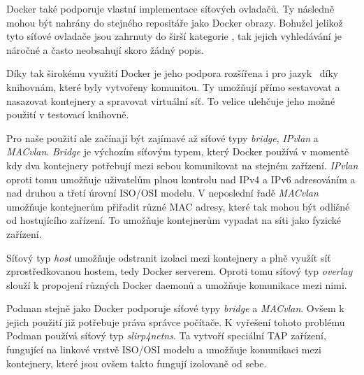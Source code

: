 Docker také podporuje vlastní implementace síťových ovladačů. Ty následně mohou být nahrány do stejného repositáře jako Docker obrazy. Bohužel jelikož tyto síťové ovladače jsou zahrnuty do širší kategorie , tak jejich vyhledávání je náročné a často neobsahují skoro žádný popis. \cite{docker_networking_overview}\cite{docker_brige_overview}

Díky tak širokému využití Docker je jeho podpora rozšířena i pro jazyk \csharp~díky knihovnám, které byly vytvořeny komunitou. Ty umožňují přímo sestavovat a nasazovat kontejnery a spravovat virtuální síť. To velice ulehčuje jeho možné použití v testovací knihovně. 

Pro naše použití ale začínají být zajímavé až síťové typy \textit{bridge}, \textit{IPvlan} a \textit{MACvlan}. \textit{Bridge} je výchozím síťovým typem, který Docker používá v momentě kdy dva kontejnery potřebují mezi sebou komunikovat na stejném zařízení. \textit{IPvlan} oproti tomu umožňuje uživatelům plnou kontrolu nad IPv4 a IPv6 adresováním a nad druhou a třetí úrovní ISO/OSI modelu. V neposlední řadě \textit{MACvlan} umožňuje kontejnerům přiřadit různé MAC adresy, které tak mohou být odlišné od hostujícího zařízení. To umožňuje kontejnerům vypadat na síti jako fyzické zařízení.

Síťový typ \textit{host} umožňuje odstranit izolaci mezi kontejnery a plně využít síť zprostředkovanou hostem, tedy Docker serverem. Oproti tomu síťový typ \textit{overlay} slouží k propojení různých Docker daemonů a umožňuje komunikace mezi nimi. 



Podman stejně jako Docker podporuje síťové typy \textit{bridge} a \textit{MACvlan}. Ovšem k jejich použití již potřebuje práva správce počítače. K vyřešení tohoto problému Podman používá síťový typ \textit{slirp4netns}. Ta vytvoří speciální TAP zařízení, fungující na linkové vrstvě ISO/OSI modelu a umožňuje komunikaci mezi kontejnery, které jsou ovšem takto fungují izolovaně od sebe. \cite{podman_network}